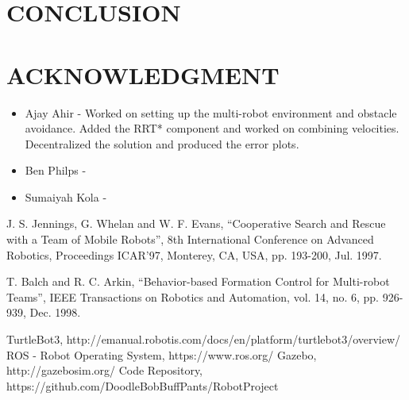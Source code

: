 \documentclass[letterpaper, 10 pt, conference]{ieeeconf}  %
\begin{document}
\section{CONCLUSION}

\addtolength{\textheight}{-12cm}   %

\section{ACKNOWLEDGMENT}

\begin{itemize}
\item Ajay Ahir - Worked on setting up the multi-robot environment and obstacle avoidance. Added the RRT* component and worked on combining velocities. Decentralized the solution and produced the error plots.

\item Ben Philps - 

\item Sumaiyah Kola - 
\end{itemize}

\begin{thebibliography}{99}
	
 J. S. Jennings, G. Whelan and W. F. Evans, ``Cooperative Search and Rescue with a Team of Mobile Robots'', 8th International Conference on Advanced Robotics, Proceedings ICAR'97, Monterey, CA, USA, pp. 193-200, Jul. 1997.

 T. Balch and R. C. Arkin, ``Behavior-based Formation Control for Multi-robot Teams'', IEEE Transactions on Robotics and Automation, vol. 14, no. 6, pp. 926-939, Dec. 1998.

 TurtleBot3, http://emanual.robotis.com/docs/en/platform/turtlebot3/overview/
 ROS - Robot Operating System, https://www.ros.org/
 Gazebo, http://gazebosim.org/
 Code Repository, https://github.com/DoodleBobBuffPants/RobotProject

\end{thebibliography}
\end{document}
